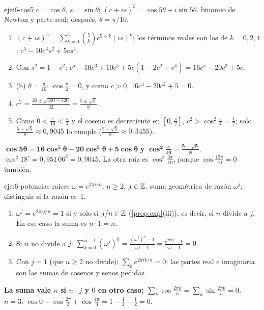 \begin{solucion}{eje:6-cos5}
\datos $c=\cos\theta$, $s=\sin\theta$; $(c+is)^{5}=\cos5\theta+i\sin5\theta$.
\planteamiento binomio de Newton y parte real; después, $\theta=\pi/10$.
\pasos
\begin{enumerate}[label=\arabic*.]
  \item $(c+is)^{5}=\sum_{k=0}^{5}\binom5kc^{5-k}(is)^{k}$; los términos reales son los de $k=0,2,4$: $c^{5}-10c^{3}s^{2}+5cs^{4}$.
  \item Con $s^{2}=1-c^{2}$: $c^{5}-10c^{3}+10c^{5}+5c(1-2c^{2}+c^{4})=16c^{5}-20c^{3}+5c$.
  \item (b) $\theta=\frac{\pi}{10}$: $\cos\frac{\pi}{2}=0$, y como $c>0$, $16c^{4}-20c^{2}+5=0$.
  \item $c^{2}=\frac{20\pm\sqrt{400-320}}{32}=\frac{5\pm\sqrt5}{8}$.
  \item Como $0<\frac{\pi}{10}<\frac{\pi}{4}$ y el coseno es decreciente en $[0,\frac{\pi}{2}]$, $c^{2}>\cos^{2}\frac{\pi}{4}=\frac12$; solo $\frac{5+\sqrt5}{8}\approx0{,}9045$ lo cumple ($\frac{5-\sqrt5}{8}\approx0{,}3455$).
\end{enumerate}
\resultado $\mathbf{\cos5\theta=16\cos^{5}\theta-20\cos^{3}\theta+5\cos\theta}$ \textbf{y} $\mathbf{\cos^{2}\frac{\pi}{10}=\frac{5+\sqrt5}{8}}$.
\comprobacion $\cos^{2}18^{\circ}=0{,}951\,06^{2}=0{,}9045$. La otra raíz es $\cos^{2}\frac{3\pi}{10}$, porque $\cos\frac{15\pi}{10}=0$ también.
\end{solucion}

\begin{solucion}{eje:6-potencias-raices}
\datos $\omega=e^{2\pi i/n}$, $n\ge2$, $j\in\mathbb{Z}$.
\planteamiento suma geométrica de razón $\omega^{j}$; distinguir si la razón es~1.
\pasos
\begin{enumerate}[label=\arabic*.]
  \item $\omega^{j}=e^{2\pi ij/n}=1$ si y solo si $j/n\in\mathbb{Z}$ (\cref{prop:exp}(iii)), es decir, si $n$ divide a $j$. En ese caso la suma es $n\cdot1=n$.
  \item Si $n$ no divide a $j$: $\sum_{k=0}^{n-1}(\omega^{j})^{k}=\frac{(\omega^{j})^{n}-1}{\omega^{j}-1}=\frac{e^{2\pi ij}-1}{\omega^{j}-1}=0$.
  \item Con $j=1$ (que $n\ge2$ no divide): $\sum_{k}e^{2\pi ik/n}=0$; las partes real e imaginaria son las sumas de cosenos y senos pedidas.
\end{enumerate}
\resultado \textbf{La suma vale $n$ si $n\mid j$ y $0$ en otro caso; $\sum_k\cos\frac{2\pi k}{n}=\sum_k\sin\frac{2\pi k}{n}=0$.}
\comprobacion $n=3$: $\cos0+\cos\frac{2\pi}{3}+\cos\frac{4\pi}{3}=1-\frac12-\frac12=0$.
\end{solucion}

